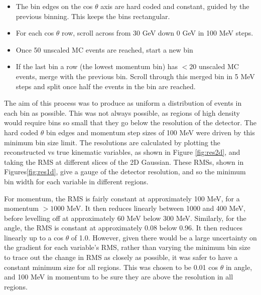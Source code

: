 \begin{itemize}

\item The bin edges on the cos $\theta$ axis are hard coded and constant, guided by the previous binning. This keeps the bins rectangular.

\item For each cos $\theta$ row, scroll across from 30 GeV down 0 GeV in 100 MeV steps.

\item Once 50 unscaled MC events are reached, start a new bin

\item If the last bin a row (the lowest momentum bin) has $<20$ unscaled MC events, merge with the previous bin. Scroll through this merged bin in 5 MeV steps and split once half the events in the bin are reached.

\end{itemize}

The aim of this process was to produce as uniform a distribution of events in each bin as possible. This was not always possible, as regions of high density would require bins so small that they go below the resolution of the detector. The hard coded $\theta$ bin edges and momentum step sizes of 100 MeV were driven by this minimum bin size limit. The resolutions are calculated by plotting the reconstructed vs true kinematic variables, as shown in Figure \ref{fig:res2d}, and taking the RMS at different slices of the 2D Gaussian. These RMSs, shown in Figures\ref{fig:res1d}, give a gauge of the detector resolution, and so the minimum bin width for each variable in different regions.

For momentum, the RMS is fairly constant at approximately 100 MeV, for a momentum $> 1000$ MeV. It then reduces linearly between 1000 and 400 MeV, before levelling off at approximately 60 MeV below 300 MeV. Similarly, for the angle, the RMS is constant at approximately 0.08 below 0.96. It then reduces linearly up to a cos $\theta$ of 1.0. However, given there would be a large uncertainty on the gradient for each variable's RMS, rather than varying the minimum bin size to trace out the change in RMS as closely as possible, it was safer to have a constant minimum size for all regions. This was chosen to be 0.01 cos $\theta$ in angle, and 100 MeV in momentum to be sure they are above the resolution in all regions. 

